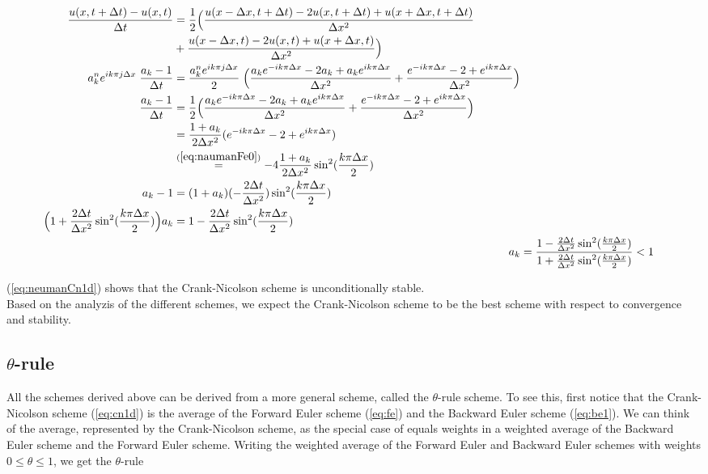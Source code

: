 \documentclass{article}
\begin{document}
\begin{subequations}
	\begin{align}
		\begin{split}
			\frac{u(x,t+\Delta t) - u(x,t)}{\Delta t} 
			&= \frac{1}{2} \Big(\frac{u(x-\Delta x,t+ \Delta t)
			- 2u(x,t+\Delta t) +u(x+\Delta x,t+\Delta t)}{\Delta x^2} \\
			&+ \frac{u(x-\Delta x,t) - 2u(x,t) +u(x+ \Delta x,t)}{\Delta x^2} \Big) \\
			a_k^n e^{i k \pi j \Delta x}\; \frac{ a_k  - 1}{\Delta t} &= \frac{a_k^n e^{i k \pi j \Delta x}}{2}\; \Big(\frac{a_k e^{-i k \pi \Delta x} - 2a_k + a_k e^{i k \pi \Delta x}}{\Delta x^2} + \frac{e^{-i k \pi \Delta x} - 2 +  e^{i k \pi \Delta x}}{\Delta x^2} \Big)\\
			\frac{ a_k  - 1}{\Delta t}&=\frac{1}{2}\Big(\frac{a_k e^{-i k \pi \Delta x} - 2a_k + a_k e^{i k \pi \Delta x}}{\Delta x^2} + \frac{e^{-i k \pi \Delta x} - 2 +  e^{i k \pi \Delta x}}{\Delta x^2} \Big)\\
			&= \frac{1+a_k}{2\Delta x^2} (e^{-i k \pi \Delta x} - 2 + e^{i k \pi \Delta x})\\
			&\stackrel{(\ref{eq:naumanFe0})}{=} -4\frac{1+a_k}{2\Delta x^2} \sin^2(\frac{k\pi \Delta x}{2})\\
			a_k -1 &= (1 + a_k) (-\frac{2 \Delta t}{\Delta x^2})\sin^2(\frac{k\pi \Delta x}{2})\\
			\Big(1 +\frac{2 \Delta t}{\Delta x^2}\sin^2(\frac{k\pi \Delta x}{2})\Big)a_k &= 1 - \frac{2 \Delta t}{\Delta x^2}\sin^2(\frac{k\pi \Delta x}{2})
			\end{split}\\
			a_k &= \frac{1 - \frac{2 \Delta t}{\Delta x^2}\sin^2(\frac{k\pi \Delta x}{2})}{1 +\frac{2 \Delta t}{\Delta x^2}\sin^2(\frac{k\pi \Delta x}{2})} < 1\label{eq:neumanCn1d}
	\end{align}
\end{subequations}

(\ref{eq:neumanCn1d}) shows that the Crank-Nicolson scheme is unconditionally stable.\\

Based on the analyzis of the different schemes, we expect the Crank-Nicolson scheme to be the best scheme with respect to convergence and stability. 

\subsection{$\theta$-rule}
All the schemes derived above can be derived from a more general scheme, called the $\theta$-rule scheme. To see this, first notice that the Crank-Nicolson scheme (\ref{eq:cn1d}) is the average of the Forward Euler scheme (\ref{eq:fe}) and the Backward Euler scheme (\ref{eq:be1}). We can think of the average, represented by the Crank-Nicolson scheme, as the special case of equals weights in a weighted average of the Backward Euler scheme and the Forward Euler scheme. Writing the weighted average of the Forward Euler and Backward Euler schemes with weights $0 \leq \theta \leq1$, we get the $\theta$-rule
\end{document}
